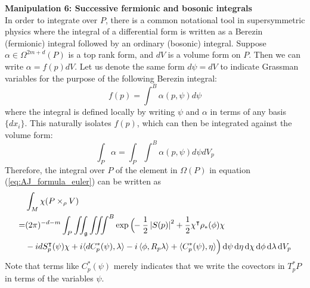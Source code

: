 \vspace{1ex}\noindent
\textbf{Manipulation 6: Successive fermionic and bosonic integrals} \\
In order to integrate over $P$, there is a common notational tool in
supersymmetric physics where the integral of a differential form is written as a
Berezin (fermionic) integral followed by an ordinary (bosonic) integral. 
Suppose $\alpha \in \Omega^{2m+d}(P)$ is a top rank form, and $dV$ is a volume form
on $P$. Then we can write $\alpha = f(p) dV$. 
Let us denote the same form $d\psi = dV $ to indicate
Grassman variables for the purpose of the following Berezin integral:
\[
f(p) = \int^B \alpha(p,\psi) d\psi
\]
where the integral is defined locally by writing $\psi$ and $\alpha$ in terms of 
any basis $\{dx_i\}$. This naturally isolates $f(p)$, which can then be integrated
against the volume form:
 \[
\int_P \alpha = \int_P \int^B \alpha(p,\psi) d\psi dV_p
\] 
Therefore, the integral over $P$ of the element in $\Omega(P)$ in equation 
(\ref{eq:AJ_formula_euler}) can be written as 
\begin{align} 
&\int_M \chi(P\times_\rho V)\nonumber \\	
= &(2\pi)^{-d-m}\int_P\iint_{\g}\iiint^B 
\exp\Big(\!\!-\frac{1}{2}\abs{S(p)}^2+\frac{1}{2}\chi^{\intercal}\rho_*(\phi)\chi 
	\label{eq:AJ_formula_susy} \\
	&- idS_p^\intercal(\psi) \chi
	+i\gen[*]{dC^*_p(\psi),\lambda}-i\gen{\phi,R_p\lambda} 
	+ \gen[*]{C^*_p(\psi),\eta}\Big)  
	\odif{\psi}\odif{\eta} \odif{\chi} \odif{\phi}\odif{\lambda}\odif{V_p} \nonumber 
\end{align}
Note that terms like $C^*_p(\psi)$ merely indicates that we write the
covectors in $T^*_pP$ in terms of the variables $\psi$. 

